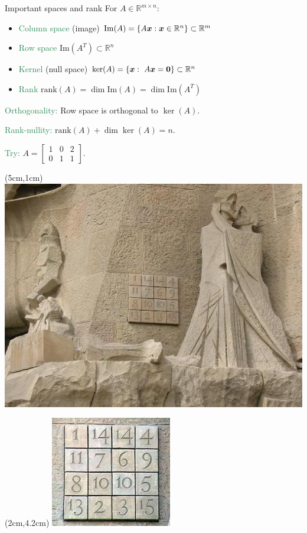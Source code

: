 \documentclass[11pt,aspectratio=169]{beamer}
\begin{document}
\begin{frame}{Important spaces and rank}
For $A\in\mathbb{R}^{m\times n}$:
\begin{itemize}
\item \textcolor{SeaGreen}{Column space} (image) $\mathrm{Im}(A)=\{A\boldsymbol x:\boldsymbol x\in\mathbb{R}^n\}\subset\mathbb{R}^m$
\item \textcolor{SeaGreen}{Row space} $\mathrm{Im}(A^T)\subset\mathbb{R}^n$
\item \textcolor{SeaGreen}{Kernel} (null space) $\ker(A)=\{\boldsymbol x:\ A\boldsymbol x=\boldsymbol 0\}\subset\mathbb{R}^n$
\item \textcolor{SeaGreen}{Rank} $\mathrm{rank}(A)=\dim \mathrm{Im}(A)=\dim \mathrm{Im}(A^T)$
\end{itemize}
\textcolor{SeaGreen}{Orthogonality:} Row space is orthogonal to $\ker(A)$.
\bigskip

\textcolor{SeaGreen}{Rank-nullity:} $\mathrm{rank}(A)+\dim\ker(A)=n$.
\bigskip

\textcolor{SeaGreen}{Try:} $A=\begin{bmatrix}1&0&2\\[2pt]0&1&1\end{bmatrix}$.
\end{frame}


\begin{frame}{}
\begin{textblock*}{4cm}(5cm,1cm)
	\includegraphics[scale=.5]{vbreaks/sf1}
\end{textblock*}
	\begin{textblock*}{4cm}(2cm,4.2cm)
\includegraphics[scale=.7]{vbreaks/sf2}
	\end{textblock*}	
\end{frame}
\end{document}
